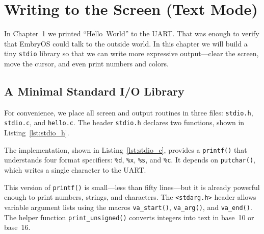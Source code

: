 \chapter{Writing to the Screen (Text Mode)}

In Chapter~1 we printed ``Hello~World'' to the UART.  That was enough to verify
that EmbryOS could talk to the outside world.  In this chapter we will build a
tiny \texttt{stdio} library so that we can write more expressive output---clear
the screen, move the cursor, and even print numbers and colors.

\section{A Minimal Standard I/O Library}

For convenience, we place all screen and output routines in three files:
\texttt{stdio.h}, \texttt{stdio.c}, and \texttt{hello.c}.  The header
\texttt{stdio.h} declares two functions, shown in
Listing~\ref{lst:stdio_h}.

\begin{figure}[H]
\centering
\begin{minipage}{0.7\textwidth}

\end{minipage}
\end{figure}

The implementation, shown in Listing~\ref{lst:stdio_c}, provides a
\texttt{printf()} that understands four format specifiers:
\texttt{\%d}, \texttt{\%x}, \texttt{\%s}, and \texttt{\%c}.  It depends on
\texttt{putchar()}, which writes a single character to the UART.

\begin{figure}[H]
\centering
\begin{minipage}{0.9\textwidth}

\end{minipage}
\end{figure}

This version of \texttt{printf()} is small---less than fifty lines---but it is
already powerful enough to print numbers, strings, and characters.  The
\texttt{<stdarg.h>} header allows variable argument lists using the macros
\texttt{va\_start()}, \texttt{va\_arg()}, and \texttt{va\_end()}.  The helper
function \texttt{print\_unsigned()} converts integers into text in base~10 or
base~16.


